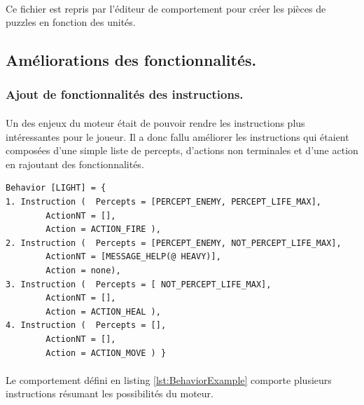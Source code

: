 \documentclass{report}
\begin{document}
\paragraph{}
Ce fichier est repris par l'éditeur de comportement pour créer les pièces de puzzles en fonction des unités.







\subsection{Améliorations des fonctionnalités.}


\subsubsection{Ajout de fonctionnalités des instructions.}
\paragraph{}Un des enjeux du moteur était de pouvoir rendre les instructions plus intéressantes pour le joueur. Il a donc fallu améliorer les instructions qui étaient composées d'une simple liste de percepts, d'actions non terminales et d'une action en rajoutant des fonctionnalités.\newline
\begin{lstlisting}[label={lst:BehaviorExample}, caption=  Exemple d'un comportement que peut renvoyer l’interpréteur.]
Behavior [LIGHT] = {
1. Instruction (  Percepts = [PERCEPT_ENEMY, PERCEPT_LIFE_MAX],
		ActionNT = [],
		Action = ACTION_FIRE ),
2. Instruction (  Percepts = [PERCEPT_ENEMY, NOT_PERCEPT_LIFE_MAX],
		ActionNT = [MESSAGE_HELP(@ HEAVY)],
		Action = none),
3. Instruction (  Percepts = [ NOT_PERCEPT_LIFE_MAX],
		ActionNT = [],
		Action = ACTION_HEAL ),
4. Instruction (  Percepts = [],
		ActionNT = [],
		Action = ACTION_MOVE ) }
\end{lstlisting}


\paragraph{}Le comportement défini en listing \ref{lst:BehaviorExample} comporte plusieurs instructions  résumant les possibilités du moteur.
\end{document}
